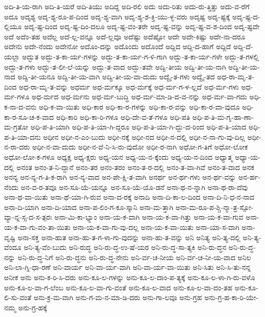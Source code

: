 {ಅದಿ-ತಿ-ಯ-ರಾಗಿ
ಅದಿ-ತಿ-ಯರೆ
ಅದಿ-ತಿಯು
ಅದಿದ್ದ
ಅದಿ-ರಲಿ
ಅದು
ಅದು-ರಿತು
ಅದು-ರು-ತ್ತಿತ್ತು
ಅದು-ವ-ರೆಗೆ
ಅದೂ
ಅದೃಶ್ಯ
ಅದೃ-ಶ್ಯ-ರೂ-ಪ-ದಿಂದ
ಅದೃ-ಶ್ಯ-ವಾಗಿ
ಅದೃ-ಶ್ಯ-ಶ-ಕ್ತಿ-ಯು-ಳ್ಳ-ವರು
ಅದೃಷ್ಟ
ಅದೃ-ಷ್ಟಕ್ಕೆ
ಅದೃ-ಷ್ಟ-ದ-ಲ್ಲಿಯೂ
ಅದೃ-ಷ್ಟ-ದಿಂದ
ಅದೃ-ಷ್ಟ-ದಿಂ-ದಲೂ
ಅದೃ-ಷ್ಟ-ವಂ-ತರೇ
ಅದೃ-ಷ್ಟ-ವನ್ನು
ಅದೃ-ಷ್ಟ-ವ-ಶ-ದಿಂದ
ಅದೃ-ಷ್ಟವೇ
ಅದೆ
ಅದೆಂ-ತಹ
ಅದೆಲ್ಲ
ಅದೆ-ಲ್ಲ-ವನ್ನೂ
ಅದೆ-ಲ್ಲವೂ
ಅದೆಷ್ಟು
ಅದೆಷ್ಟೋ
ಅದೇ
ಅದೇ-ಕಿಷ್ಟು
ಅದೇ-ನಾ-ದರೂ
ಅದೇನು
ಅದೇ-ನೆಂದು
ಅದೇನೋ
ಅದೊಂ-ದನ್ನು
ಅದೊಂದು
ಅದೊಂದೆ
ಅದ್ದಿದ
ಅದ್ದಿ-ದ-ಹಾಗೆ
ಅದ್ದಿದೆ
ಅದ್ದಿ-ದೆ-ಯಲ್ಲಾ
ಅದ್ಭುತ
ಅದ್ಭು-ತ-ಕಾ-ರ್ಯ-ಗಳನ್ನು
ಅದ್ಭು-ತ-ಕಾ-ರ್ಯ-ಗ-ಳಿ-ಗಾಗಿ
ಅದ್ಭು-ತ-ಕಾ-ರ್ಯ-ಗಳೇ
ಅದ್ಭು-ತ-ಗಳಲ್ಲಿ
ಅದ್ಭು-ತ-ಗಳು
ಅದ್ಭು-ತ-ಲೀ-ಲೆ-ಯನ್ನು
ಅದ್ಭು-ತ-ವಾದ
ಅದ್ಭು-ತವೇ
ಅದ್ವಿ-ತೀಯ
ಅದ್ವಿ-ತೀ-ಯ-ನಾಗಿ
ಅದ್ವಿ-ತೀ-ಯ-ನಾದ
ಅದ್ವಿ-ತೀ-ಯನೂ
ಅದ್ವಿ-ತೀ-ಯ-ವಾಗಿ
ಅದ್ವಿ-ತೀ-ಯ-ವಾ-ದುದು
ಅದ್ವೈ-ತ-ಗಳು
ಅದ್ವೈ-ತದ
ಅಧ-ರಾ-ಮೃ-ತ-ದಿಂದ
ಅಧ-ರಾ-ಮೃ-ತ-ವನ್ನು
ಅಧರ್ಮ
ಅಧ-ರ್ಮಕ್ಕೂ
ಅಧ-ರ್ಮಕ್ಕೆ
ಅಧ-ರ್ಮ-ಗ-ಳ-ಲ್ಲದೆ
ಅಧ-ರ್ಮ-ಗಳು
ಅಧ-ರ್ಮ-ಗಳೂ
ಅಧ-ರ್ಮದ
ಅಧ-ರ್ಮನು
ಅಧ-ರ್ಮ-ಬುದ್ಧಿ
ಅಧ-ರ್ಮ-ಮಾ-ಡಿ-ದ-ವ-ನನ್ನು
ಅಧ-ರ್ಮ-ವಾ-ಗದು
ಅಧಿ-ಕ-ನಾ-ದ-ವನು
ಅಧಿ-ಕ-ವಾ-ಯಿತು
ಅಧಿ-ಕಾರ
ಅಧಿ-ಕಾ-ರ-ಗಳನ್ನು
ಅಧಿ-ಕಾ-ರ-ವನ್ನು
ಅಧಿ-ಕಾ-ರ-ವಾ-ವುದೂ
ಅಧಿ-ಕಾ-ರ-ಸೂ-ಚ-ಕ-ವಾದ
ಅಧಿ-ಕಾರಿ
ಅಧಿ-ಕಾ-ರಿ-ಗಳೂ
ಅಧಿ-ದೇ-ವ-ತೆ-ಗಳೂ
ಅಧಿ-ಪತಿ
ಅಧಿ-ಪ-ತಿ-ಮ-ಗೃ-ಹಾ-ಣಾ-ಮ-ಗ್ರತೋ
ಅಧಿ-ಪ-ತಿ-ಯಾಗಿ
ಅಧಿ-ಪ-ತಿ-ಯಾ-ಗಿ-ದ್ದರೂ
ಅಧಿ-ಪ-ತಿ-ಯಾ-ಗಿ-ದ್ದು-ದ-ರಿಂದ
ಅಧಿ-ಪ-ತಿ-ಯಾದ
ಅಧಿ-ಪ-ತಿ-ಯಾ-ದನು
ಅಧೀನ
ಅಧೀ-ನ-ಎಂ-ಬುದು
ಅಧೀ-ನಕ್ಕೆ
ಅಧೀ-ನದ
ಅಧೀ-ನ-ದಲ್ಲಿ
ಅಧೀ-ನ-ನಾ-ಗು-ವು-ದಿಲ್ಲ
ಅಧೀ-ನ-ರಾ-ದರು
ಅಧೀ-ನ-ವಾ-ದುದು
ಅಧೀ-ನ-ವೆ-ನಿ-ಸಿ-ರು-ವುದೋ
ಅಧೀ-ರ-ನಾಗಿ
ಅಧೋ-ಗ-ತಿಗೆ
ಅಧೋ-ಲೋಕ
ಅಧೋ-ಲೋ-ಕ-ಗಳೂ
ಅಧ್ಯಕ್ಷ
ಅಧ್ಯ-ಕ್ಷರು
ಅಧ್ಯ-ಯನ
ಅಧ್ಯ-ಯ-ನ-ಕ್ಕೆಂದು
ಅಧ್ಯ-ಯ-ನ-ದಿಂದ
ಅಧ್ಯಾತ್ಮ
ಅಧ್ಯಾ-ಯ-ದಲ್ಲಿ
ಅನಂತ
ಅನಂ-ತ-ನಿ-ದ್ದಾನೆ
ಅನಂ-ತರ
ಅನಂ-ತರಂ
ಅನಂ-ತ-ರ-ದಲ್ಲಿ
ಅನಂ-ತ-ವಾ-ಗಿವೆ
ಅನಂ-ತ-ವಾದ
ಅನಕ
ಅನನ್ಯ
ಅನ-ನ್ಯ-ಗ-ತಿ-ಕ-ರಾಗಿ
ಅನ-ನ್ಯ-ವಾದ
ಅನ-ಪೇ-ಕ್ಷಿ-ತ-ವಾಗಿ
ಅನರ್ಥ
ಅನ-ರ್ಥ-ಗಳು
ಅನ-ರ್ಥ-ವನ್ನು
ಅನ-ರ್ಹ-ನೆಂದು
ಅನ-ವ-ರ-ತವೂ
ಅನ-ಸೂ-ಯೆ-ಯನ್ನೂ
ಅನ-ಸೂ-ಯೆ-ಯೊ-ಡನೆ
ಅನಾ-ಥ-ನ-ನ್ನಾಗಿ
ಅನಾ-ಥ-ರಾ-ದೆವು
ಅನಾ-ಥ-ವಾ-ಯಿತು
ಅನಾ-ಥೆ-ಯಾ-ಗಿ-ರುವ
ಅನಾ-ದ-ರಕ್ಕೆ
ಅನಾದಿ
ಅನಾ-ದಿ-ಕಾ-ಲ-ದಿಂದ
ಅನಾ-ದಿ-ನಿ-ಧ-ನ-ನಾದ
ಅನಾ-ದಿ-ಯಾಗಿ
ಅನಾ-ದಿ-ಯಾದ
ಅನಾ-ಪ-ಲಿಂ-ಗ-ಕೂ-ಸ್ಕಾನಿ
ಅನಾ-ಮ-ತ್ತಾಗಿ
ಅನಾ-ಮ-ರೂ-ಪ-ಶ್ಚಿ-ನ್ಮಾ-ತ್ರ-ಸ್ಸೋ-ವ್ಯಾ-ನ್ನ-ಸ್ಸ-ದ-ಸ-ತ್ಪರಃ
ಅನಾ-ಮಿ-ಕಾ-ಭ್ಯಾಂ
ಅನಾ-ಯ-ಕ-ವಾಗಿ
ಅನಾ-ಯ-ಕ-ವಾ-ಗಿತ್ತು
ಅನಾ-ಯ-ಕ-ವಾ-ಗುವ
ಅನಾ-ಯ-ಕ-ವಾ-ಗು-ವಂ-ತಾ-ಯಿತು
ಅನಾ-ಯ-ಕ-ವಾ-ಗು-ವು-ದಲ್ಲ
ಅನಾ-ಯ-ಕ-ವಾ-ಯಿತು
ಅನಾ-ಯಾ-ಸ-ವಾಗಿ
ಅನಾ-ವೃಷ್ಟಿ
ಅನಾ-ಸಕ್ತ
ಅನಾ-ಹುತ
ಅನಾ-ಹು-ತ-ಗ-ಳಾ-ಗು-ವುದನ್ನು
ಅನಾ-ಹು-ತ-ವನ್ನು
ಅನಿ
ಅನಿತ್ಯ
ಅನಿ-ತ್ಯ-ದಲ್ಲಿ
ಅನಿ-ತ್ಯ-ವೆಂದೂ
ಅನಿ-ತ್ಯ-ವೆಂ-ಬುದು
ಅನಿ-ರುದ್ಧ
ಅನಿ-ರು-ದ್ಧ-ಉ-ಷೆ-ಯರ
ಅನಿ-ರು-ದ್ಧ-ಸಾ-ತ್ಯಕಿ
ಅನಿ-ರು-ದ್ಧನ
ಅನಿ-ರು-ದ್ಧ-ನನ್ನು
ಅನಿ-ರು-ದ್ಧ-ನಿಗೆ
ಅನಿ-ರು-ದ್ಧನು
ಅನಿ-ರು-ದ್ಧ-ನೇನು
ಅನಿ-ರ್ವ-ಚ-ನೀಯ
ಅನಿ-ರ್ವ-ಚ-ನೀ-ಯ-ವಾದ
ಅನಿಲ
ಅನಿ-ಲಾ-ಗ್ನಿ-ಧಾ-ರಣೆ
ಅನಿ-ವಾರ್ಯ
ಅನಿ-ವಾ-ರ್ಯ-ವಾಗಿ
ಅನಿ-ವಾ-ರ್ಯ-ವಾ-ಯಿತು
ಅನಿ-ಸಿತು
ಅನಿ-ಸಿ-ತು-ನನ್ನ
ಅನೀಕ
ಅನು
ಅನು-ಕ-ರಿ-ಸಿ-ದರು
ಅನು-ಕೂ-ಲ-ಗಳನ್ನು
ಅನು-ಕೂ-ಲ-ದಾಂ-ಪ-ತ್ಯಕ್ಕೆ
ಅನು-ಕೂ-ಲ-ಳಾ-ಗಿ-ರು-ವಳೊ
ಅನು-ಕೂ-ಲ-ವಾ-ಗ-ಲೆಂಬ
ಅನು-ಕೂ-ಲ-ವಾ-ಗು-ವಂತೆ
ಅನು-ಕೂ-ಲ-ವಾದ
ಅನು-ಕೂ-ಲ-ವಾ-ದಂ-ತಹ
ಅನು-ಕೂ-ಲಿ-ಸು-ವಂತೆ
ಅನು-ಕ್ರ-ಮ-ವಾಗಿ
ಅನು-ಗ-ಮ-ನ-ಮಾ-ಡಿ-ದರು
ಅನು-ಗಾ-ಲವೂ
ಅನು-ಗ್ರಹ
ಅನು-ಗ್ರ-ಹ-ಕಾ-ರಿ-ಯೇ-ನಮ್ಮ
ಅನು-ಗ್ರ-ಹಕ್ಕೆ
}
